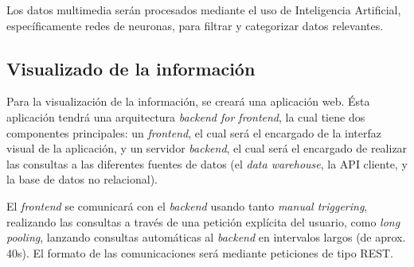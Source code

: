 Los datos multimedia serán procesados mediante el uso de Inteligencia Artificial, específicamente redes de neuronas, para filtrar y categorizar datos relevantes.



\subsection{Visualizado de la información}
Para la visualización de la información, se creará una aplicación web. 
Ésta aplicación tendrá una arquitectura \textit{backend for frontend}, la cual tiene dos componentes principales: un \textit{frontend}, el cual será el encargado de la interfaz visual de la aplicación, y un servidor \textit{backend}, el cual será el encargado de realizar las consultas a las diferentes fuentes de datos (el \textit{data warehouse}, la API cliente, y la base de datos no relacional).

El \textit{frontend} se comunicará con el \textit{backend} usando tanto \textit{manual triggering}, realizando las consultas a través de una petición explícita del usuario, como \textit{long pooling}, lanzando consultas automáticas al \textit{backend} en intervalos largos (de aprox. 40s). El formato de las comunicaciones será mediante peticiones de tipo REST.
